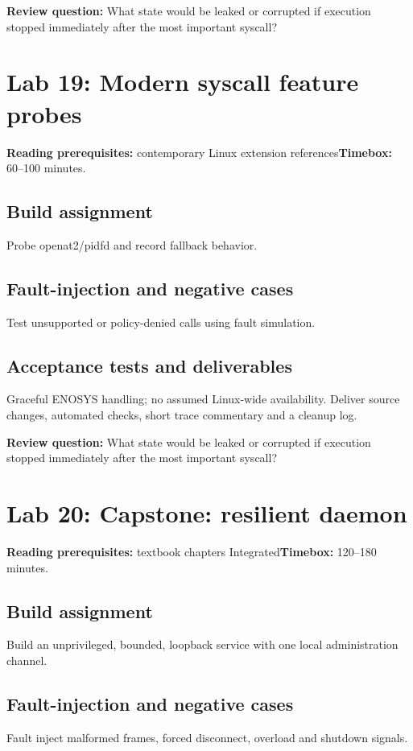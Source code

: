 \documentclass[11pt,letterpaper,oneside]{report}
\begin{document}
\textbf{Review question:} What state would be leaked or corrupted if execution stopped immediately after the most important syscall?

\section{Lab 19: Modern syscall feature probes}
\textbf{Reading prerequisites:} contemporary Linux extension references\quad \textbf{Timebox:} 60--100 minutes.

\subsection{Build assignment}
Probe openat2/pidfd and record fallback behavior.

\subsection{Fault-injection and negative cases}
Test unsupported or policy-denied calls using fault simulation.

\subsection{Acceptance tests and deliverables}
Graceful ENOSYS handling; no assumed Linux-wide availability. Deliver source changes, automated checks, short trace commentary and a cleanup log.

\textbf{Review question:} What state would be leaked or corrupted if execution stopped immediately after the most important syscall?

\section{Lab 20: Capstone: resilient daemon}
\textbf{Reading prerequisites:} textbook chapters Integrated\quad \textbf{Timebox:} 120--180 minutes.

\subsection{Build assignment}
Build an unprivileged, bounded, loopback service with one local administration channel.

\subsection{Fault-injection and negative cases}
Fault inject malformed frames, forced disconnect, overload and shutdown signals.
\end{document}
